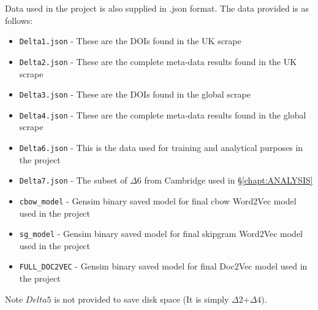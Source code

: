 Data used in the project is also supplied in .json format. The data provided is as follows:
\begin{itemize}
\item \texttt{Delta1.json} - These are the DOIs found in the UK scrape
\item \texttt{Delta2.json} - These are the complete meta-data results found in the UK scrape
\item \texttt{Delta3.json} - These are the DOIs found in the global scrape
\item \texttt{Delta4.json} - These are the complete meta-data results found in the global scrape
\item \texttt{Delta6.json} - This is the data used for training and analytical purposes in the project
\item \texttt{Delta7.json} - The subset of $\Delta6$ from Cambridge used in \S\ref{chapt:ANALYSIS}
\item \texttt{cbow_model} - Gensim binary saved model for final cbow Word2Vec model used in the project
\item \texttt{sg_model} - Gensim binary saved model for final skipgram Word2Vec model used in the project
\item \texttt{FULL_DOC2VEC} - Gensim binary saved model for final Doc2Vec model used in the project
\end{itemize}
Note $Delta5$ is not provided to save disk space (It is simply $\Delta2$+$\Delta4$).